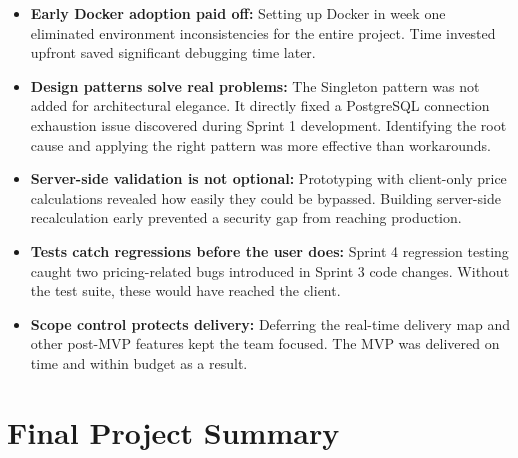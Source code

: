 \documentclass[12pt,a4paper]{report}
\begin{document}
\begin{itemize}
  \item \textbf{Early Docker adoption paid off:} Setting up Docker in week one eliminated environment inconsistencies for the entire project. Time invested upfront saved significant debugging time later.

  \item \textbf{Design patterns solve real problems:} The Singleton pattern was not added for architectural elegance. It directly fixed a PostgreSQL connection exhaustion issue discovered during Sprint 1 development. Identifying the root cause and applying the right pattern was more effective than workarounds.

  \item \textbf{Server-side validation is not optional:} Prototyping with client-only price calculations revealed how easily they could be bypassed. Building server-side recalculation early prevented a security gap from reaching production.

  \item \textbf{Tests catch regressions before the user does:} Sprint 4 regression testing caught two pricing-related bugs introduced in Sprint 3 code changes. Without the test suite, these would have reached the client.

  \item \textbf{Scope control protects delivery:} Deferring the real-time delivery map and other post-MVP features kept the team focused. The MVP was delivered on time and within budget as a result.
\end{itemize}

\section{Final Project Summary}
\end{document}
